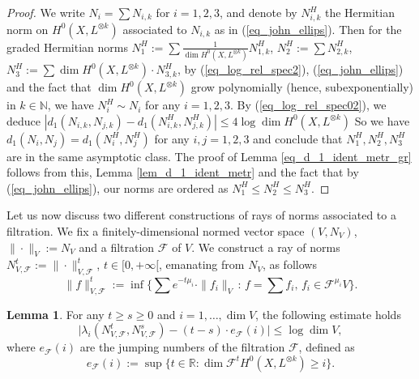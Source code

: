 \documentclass[12pt]{article}
\numberwithin{equation}{section}
\theoremstyle{theorem}
\theoremstyle{definition}
\newtheorem{lem}[thm]{Lemma}
\theoremstyle{remark}
\newcommand{\real}{\mathbb{R}}
\newcommand{\nat}{\mathbb{N}}
\begin{document}
	\begin{sloppypar}
	\begin{proof}
		We write $N_i = \sum N_{i, k}$ for $i = 1, 2, 3$, and denote by $N_{i, k}^H$ the Hermitian norm on $H^0(X, L^{\otimes k})$ associated to $N_{i, k}$ as in (\ref{eq_john_ellips}).
		Then for the graded Hermitian norms $N_1^H := \sum \frac{1}{\dim H^0(X, L^{\otimes k})} N_{1, k}^H$, $N_2^H := \sum N_{2, k}^H$, $N_3^H := \sum \dim H^0(X, L^{\otimes k}) \cdot N_{3, k}^H$, by (\ref{eq_log_rel_spec2}), (\ref{eq_john_ellips}) and the fact that $\dim H^0(X, L^{\otimes k})$ grow polynomially (hence, subexponentially) in $k \in \nat$, we have $N_i^H \sim N_i$ for any $i = 1, 2, 3$.
		By (\ref{eq_log_rel_spec02}), we deduce $| d_1(N_{i, k}, N_{j, k}) - d_1(N_{i, k}^H, N_{j, k}^H) | \leq 4 \log \dim H^0(X, L^{\otimes k})$ 
		So we have $d_1(N_i, N_j) = d_1(N_i^H, N_j^H)$ for any $i, j = 1, 2, 3$ and conclude that $N_1^H, N_2^H, N_3^H$ are in the same asymptotic class.
		The proof of Lemma \ref{eq_d_1_ident_metr_gr} follows from this, Lemma \ref{lem_d_1_ident_metr} and the fact that by (\ref{eq_john_ellips}), our norms are ordered as $N_1^H \leq N_2^H \leq N_3^H$.
	\end{proof}
	\end{sloppypar}
	\par 
	Let us now discuss two different constructions of rays of norms associated to a filtration.
	We fix a finitely-dimensional normed vector space $(V, N_V)$, $\| \cdot \|_V := N_V$ and a filtration $\mathcal{F}$ of $V$.
	We construct a ray of norms $N_{V, \mathcal{F}}^t := \| \cdot \|_{V, \mathcal{F}}^t$, $t \in [0, +\infty[$, emanating from $N_V$, as follows
	\begin{equation}\label{eq_ray_norm_defn0}
		\| f \|_{V, \mathcal{F}}^t :=
		\inf 
		\Big\{
			\sum
			e^{- t \mu_i} \cdot 
			\| f_i \|_V
			\,
			:
			\,
			f = \sum f_i, \, f_i \in \mathcal{F}^{\mu_i} V
		\Big\}.
	\end{equation}
	\begin{lem}\label{lem_log_spec_ray}
		For any $t \geq s \geq 0$ and $i = 1, \ldots, \dim V$, the following estimate holds
		\begin{equation}
			\Big| \lambda_i(N_{V, \mathcal{F}}^t, N_{V, \mathcal{F}}^s) - (t - s) \cdot e_{\mathcal{F}}(i) \Big|
			\leq
			\log \dim V,
		\end{equation}
		where $e_{\mathcal{F}}(i)$ are the jumping numbers of the filtration $\mathcal{F}$, defined as
		\begin{equation}\label{eq_defn_jump_numborig}
			e_{\mathcal{F}}(i) := \sup \Big\{ t \in \real : \dim \mathcal{F}^t H^0(X, L^{\otimes k}) \geq i \Big\}.
		\end{equation}
	\end{lem}
\end{document}
